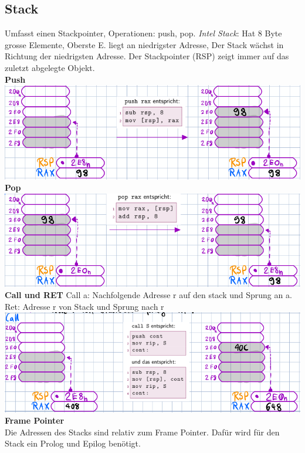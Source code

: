 \documentclass[7pt,landscape,a4paper]{scrartcl}
\begin{document}
\begin{multicols*}{4}
\subsection{Stack}
\vspace{-0.75em}
Umfasst einen Stackpointer, Operationen: push, pop. \textit{Intel Stack}: Hat 8 Byte grosse Elemente, Oberste E. liegt an niedrigster Adresse, Der Stack wächst in Richtung der niedrigsten Adresse. Der Stackpointer (RSP) zeigt immer auf das zuletzt abgelegte Objekt. \\
\textbf{Push}\\
\includegraphics[width=\linewidth]{stackpush}
\textbf{Pop}\\
\includegraphics[width=\linewidth]{stackpop}\\
\textbf{Call und RET}
Call a: Nachfolgende Adresse r auf den stack und Sprung an a. Ret: Adresse r von Stack und Sprung nach r\\
\includegraphics[width=\linewidth]{stackcallret}
\textbf{Frame Pointer}\\
Die Adressen des Stacks sind relativ zum Frame Pointer. Dafür wird für den Stack ein Prolog und Epilog benötigt.\\

\end{multicols*}
\end{document}
